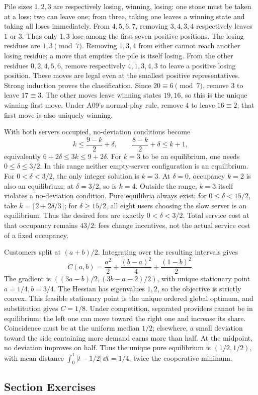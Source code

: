 Pile sizes $1,2,3$ are respectively losing, winning, losing: one stone must be taken at a loss; two can leave one; from three, taking one leaves a winning state and taking all loses immediately. From $4,5,6,7$, removing $3,4,3,4$ respectively leaves $1$ or $3$. Thus only $1,3$ lose among the first seven positive positions.
The losing residues are $1,3\pmod7$. Removing $1,3,4$ from either cannot reach another losing residue; a move that empties the pile is itself losing. From the other residues $0,2,4,5,6$, remove respectively $4,1,3,4,3$ to leave a positive losing position. These moves are legal even at the smallest positive representatives. Strong induction proves the classification.
Since $20\equiv6\pmod7$, remove $3$ to leave $17\equiv3$. The other moves leave winning states $19,16$, so this is the unique winning first move. Under A09's normal-play rule, remove $4$ to leave $16\equiv2$; that first move is also uniquely winning.

With both servers occupied, no-deviation conditions become
\[
 k\le\frac{9-k}{2}+\delta,\qquad
 \frac{8-k}{2}+\delta\le k+1,
\]
equivalently $6+2\delta\le3k\le9+2\delta$. For $k=3$ to be an equilibrium, one needs $0\le\delta\le3/2$. In this range neither empty-server configuration is an equilibrium. For $0<\delta<3/2$, the only integer solution is $k=3$.
At $\delta=0$, occupancy $k=2$ is also an equilibrium; at $\delta=3/2$, so is $k=4$. Outside the range, $k=3$ itself violates a no-deviation condition. Pure equilibria always exist: for $0\le\delta<15/2$, take $k=\lceil2+2\delta/3\rceil$; for $\delta\ge15/2$, all eight users choosing the slow server is an equilibrium. Thus the desired fees are exactly $0<\delta<3/2$. Total service cost at that occupancy remains $43/2$: fees change incentives, not the actual service cost of a fixed occupancy.

Customers split at $(a+b)/2$. Integrating over the resulting intervals gives
\[
 C(a,b)=\frac{a^2}{2}+\frac{(b-a)^2}{4}
       +\frac{(1-b)^2}{2}.
\]
The gradient is $((3a-b)/2,(3b-a-2)/2)$, with unique stationary point $a=1/4,b=3/4$. The Hessian has eigenvalues $1,2$, so the objective is strictly convex. This feasible stationary point is the unique ordered global optimum, and substitution gives $C=1/8$.
Under competition, separated providers cannot be in equilibrium: the left one can move toward the right one and increase its share. Coincidence must be at the uniform median $1/2$; elsewhere, a small deviation toward the side containing more demand earns more than half. At the midpoint, no deviation improves on half. Thus the unique pure equilibrium is $(1/2,1/2)$, with mean distance $\int_0^1|t-1/2|\,\dd t=1/4$, twice the cooperative minimum.

\par{}
\subsection*{Section Exercises}





